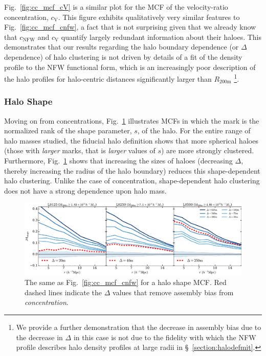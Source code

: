\documentclass[usenatbib,fleqn]{mnras}
\begin{document}
Fig.~\ref{fig:cc_mcf_cV} is a similar plot for the MCF of the velocity-ratio concentration, $c_{\mathrm{V}}$. This figure exhibits qualitatively very similar features to Fig.~\ref{fig:cc_mcf_cnfw}, a fact that is not surprising given that we already know that $c_{\mathrm{NFW}}$ and $c_{\mathrm{V}}$ quantify largely redundant information about their haloes. This demonstrates that our results regarding the halo boundary dependence (or $\Delta$ dependence) of halo clustering is not driven by details of a fit of the density profile to the NFW functional form, which is an increasingly poor description of the halo profiles for halo-centric distances significantly larger than $R_{200\mathrm{m}}$ \citep[e.g.,][]{diemer_kravtsov14} 
%
\footnote{We provide a further demonstration that the decrease in assembly bias due to the decrease in $\Delta$ in this case is not due to the fidelity with which the NFW profile describes halo density profiles at large radii in \S~\ref{section:halodefmit}.}.

\subsubsection{Halo Shape}

Moving on from concentrations, Fig.~\ref{fig:cc_mcf_s} illustrates MCFs in which the mark is the normalized rank of the shape parameter, $s$, of the halo. For the entire range of halo masses studied, the fiducial halo definition shows that more spherical haloes (those with {\em larger} marks, that is {\em larger} values of $s$) are more strongly clustered. Furthermore, Fig.~\ref{fig:cc_mcf_s} shows that increasing the sizes of haloes (decreasing $\Delta$, thereby increasing the radius of the halo boundary) reduces this shape-dependent halo clustering. Unlike the case of concentration, shape-dependent halo clustering does not have a strong dependence upon halo mass.

\begin{figure}
	\centering
	\includegraphics[width=\textwidth]{all_mcf_shape.pdf}
	\caption{
The same as Fig.~\ref{fig:cc_mcf_cnfw} for a halo shape MCF.
Red dashed lines indicate the $\Delta$ values that remove assembly bias from \emph{concentration}. 
}
	\label{fig:cc_mcf_s}
\end{figure}
\end{document}
